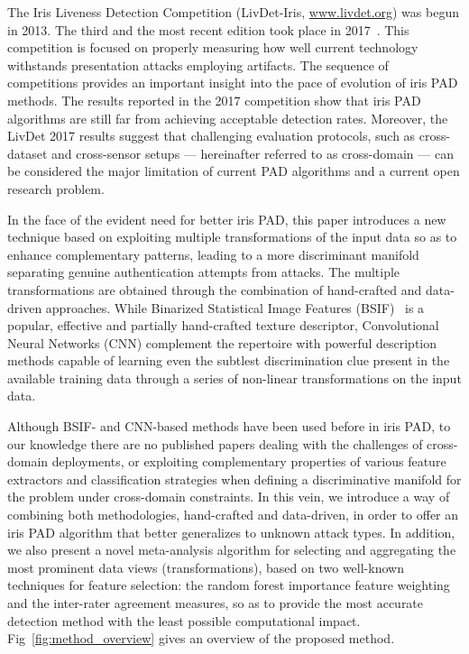 The Iris Liveness Detection Competition (LivDet-Iris, \url{www.livdet.org})
was begun in 2013.
The third and the most recent edition took place in 2017~\cite{Yambay2017}.
This competition is focused on properly measuring how well current technology withstands presentation attacks employing artifacts.
The sequence of competitions provides an important insight into 
the pace of evolution of iris PAD methods. 
The results reported in the 2017 competition show that iris PAD algorithms are still far from achieving acceptable detection rates. Moreover, the LivDet 2017 results suggest that challenging evaluation protocols, such as cross-dataset and cross-sensor setups --- hereinafter referred to as cross-domain --- can be considered the major limitation of current PAD algorithms and a current open research problem.

In the face of the evident need for better iris PAD,
this paper introduces a new technique based on exploiting multiple transformations of the input data so as to enhance complementary patterns, leading to a more discriminant manifold separating genuine authentication attempts from attacks.
The multiple transformations are obtained through the combination of hand-crafted and data-driven approaches. While Binarized Statistical Image Features (BSIF)~\cite{Kannala_ICPR_2012} is a popular, effective and partially hand-crafted texture descriptor, Convolutional Neural Networks (CNN) complement the repertoire with powerful description methods capable of learning even the subtlest discrimination clue present in the available training data through a series of non-linear transformations on the input data. 

Although BSIF- and CNN-based methods have been used before in iris PAD, to our knowledge there are no published papers dealing with the challenges of cross-domain deployments, or exploiting complementary properties of various feature extractors and classification strategies when defining a discriminative manifold for the problem under cross-domain constraints. In this vein, we introduce a way of combining both methodologies, hand-crafted and data-driven, in order to offer an iris PAD algorithm that better generalizes to unknown attack types. In addition, we also present a novel meta-analysis algorithm for selecting and aggregating the most prominent data views (\ie transformations), based on two well-known techniques for feature selection: the random forest importance feature weighting and the inter-rater agreement measures, so as to provide the most accurate detection method with the least possible computational impact. Fig~\ref{fig:method_overview} gives an overview of the proposed method.

